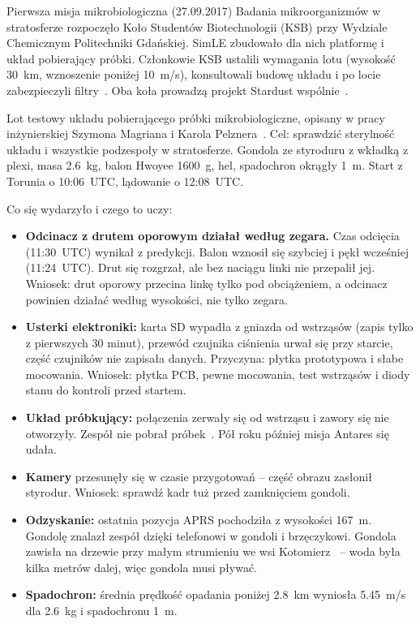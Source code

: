 \clearpage
\begin{sekcja}{Pierwsza misja mikrobiologiczna (27.09.2017)}
Badania mikroorganizmów w stratosferze rozpoczęło Koło Studentów Biotechnologii (KSB) przy Wydziale Chemicznym Politechniki Gdańskiej. SimLE zbudowało dla nich platformę i układ pobierający próbki. Członkowie KSB ustalili wymagania lotu (wysokość \SI{30}{km}, wznoszenie poniżej \SI{10}{m/s}), konsultowali budowę układu i po locie zabezpieczyli filtry~\cite{magrian2018}. Oba koła prowadzą projekt Stardust wspólnie~\cite{pg2021}.

Lot testowy układu pobierającego próbki mikrobiologiczne, opisany w pracy inżynierskiej Szymona Magriana i Karola Pelznera~\cite{magrian2018}. Cel: sprawdzić sterylność układu i wszystkie podzespoły w stratosferze. Gondola ze styroduru z wkładką z plexi, masa \SI{2.6}{kg}, balon Hwoyee \SI{1600}{g}, hel, spadochron okrągły \SI{1}{m}. Start z Torunia o 10:06~UTC, lądowanie o 12:08~UTC.

Co się wydarzyło i czego to uczy:
\begin{itemize}
  \item \textbf{Odcinacz z drutem oporowym działał według zegara.} Czas odcięcia (11:30~UTC) wynikał z predykcji. Balon wznosił się szybciej i pękł wcześniej (11:24~UTC). Drut się rozgrzał, ale bez naciągu linki nie przepalił jej. Wniosek: drut oporowy przecina linkę tylko pod obciążeniem, a odcinacz powinien działać według wysokości, nie tylko zegara.
  \item \textbf{Usterki elektroniki:} karta SD wypadła z gniazda od wstrząsów (zapis tylko z pierwszych 30 minut), przewód czujnika ciśnienia urwał się przy starcie, część czujników nie zapisała danych. Przyczyna: płytka prototypowa i słabe mocowania. Wniosek: płytka PCB, pewne mocowania, test wstrząsów i diody stanu do kontroli przed startem.
  \item \textbf{Układ próbkujący:} połączenia zerwały się od wstrząsu i zawory się nie otworzyły. Zespół nie pobrał próbek~\cite{fbstardust}. Pół roku później misja Antares się udała.
  \item \textbf{Kamery} przesunęły się w czasie przygotowań -- część obrazu zasłonił styrodur. Wniosek: sprawdź kadr tuż przed zamknięciem gondoli.
  \item \textbf{Odzyskanie:} ostatnia pozycja APRS pochodziła z wysokości \SI{167}{m}. Gondolę znalazł zespół dzięki telefonowi w gondoli i brzęczykowi. Gondola zawisła na drzewie przy małym strumieniu we wsi Kotomierz~\cite{fbstardust} -- woda była kilka metrów dalej, więc gondola musi pływać.
  \item \textbf{Spadochron:} średnia prędkość opadania poniżej \SI{2.8}{km} wyniosła \SI{5.45}{m/s} dla \SI{2.6}{kg} i spadochronu \SI{1}{m}.
\end{itemize}


\end{sekcja}
